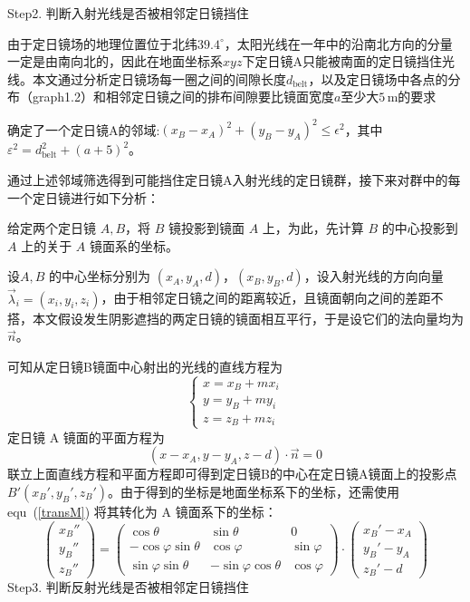 \documentclass[../main.tex]{subfiles}
\begin{document}
Step2. 判断入射光线是否被相邻定日镜挡住

由于定日镜场的地理位置位于北纬\(39.4^{\circ}\)，太阳光线在一年中的沿南北方向的分量一定是由南向北的，因此在地面坐标系\(xyz\)下定日镜A只能被南面的定日镜挡住光线。本文通过分析定日镜场每一圈之间的间隙长度\(d_{\mathrm{belt}}\)，以及定日镜场中各点的分布（graph1.2）和相邻定日镜之间的排布间隙要比镜面宽度\(a\)至少大\(5 \, \mathrm{m}\)的要求

确定了一个定日镜A的邻域:\((x_B - x_A)^2 + (y_B - y_A)^2 \le \epsilon^2\)，其中\(\varepsilon^2=d_{\mathrm{belt}}^2+(a+5)^2\)。

通过上述邻域筛选得到可能挡住定日镜A入射光线的定日镜群，接下来对群中的每一个定日镜进行如下分析：

给定两个定日镜 \(A, B\)，将 \(B\) 镜投影到镜面 \(A\) 上，为此，先计算 \(B\) 的中心投影到 \(A\) 上的关于 \(A\) 镜面系的坐标。

设\(A,B\) 的中心坐标分别为 \((x_{A}, y_{A}, d)\)，\((x_{B}, y_{B}, d)\)，设入射光线的方向向量 \(\vec \lambda _{i} = (x_{i}, y_{i}, z_{i})\)，由于相邻定日镜之间的距离较近，且镜面朝向之间的差距不搭，本文假设发生阴影遮挡的两定日镜的镜面相互平行，于是设它们的法向量均为 \(\vec n\)。

可知从定日镜B镜面中心射出的光线的直线方程为
\[
\begin{cases}
x = x _{B} + m x_{i}\\
y = y _{B} + my_{i} \\
z = z_{B} + m z_{i}
\end{cases}
\]
定日镜 A 镜面的平面方程为
\[
(x - x_{A} , y- y _{A} , z - d) \cdot \vec n = 0
\]
联立上面直线方程和平面方程即可得到定日镜B的中心在定日镜A镜面上的投影点 \(B' (x_{B}' , y_{B} ' , z _{B} ')\)。由于得到的坐标是地面坐标系下的坐标，还需使用 equ~(\ref{transM}) 将其转化为 A 镜面系下的坐标：
\[
\begin{pmatrix}
x_{B} ''\\
y_{B} ''\\
z _{B} ''
\end{pmatrix}
=
\begin{pmatrix}
\cos \theta & \sin \theta & 0\\
-\cos \varphi \sin \theta & \cos \varphi & \sin \varphi \\
\sin \varphi \sin \theta & - \sin \varphi \cos \theta & \cos \varphi
\end{pmatrix}
\cdot
\begin{pmatrix}
x_{B} ' - x_{A}\\
y_{B}' - y_{A} \\
z_{B} ' - d
\end{pmatrix}
\]
Step3. 判断反射光线是否被相邻定日镜挡住
\end{document}

